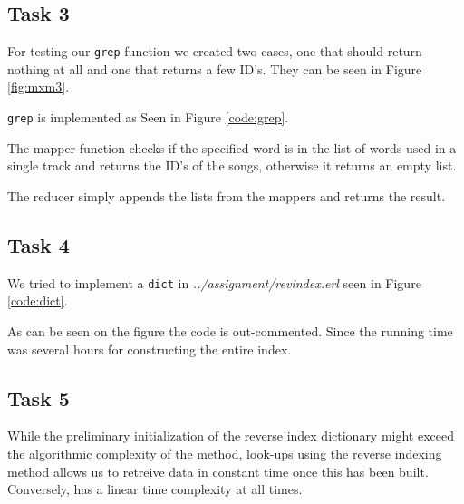 \subsection{Task 3}
For testing our \texttt{grep} function we created two cases, one that should
return nothing at all and one that returns a few ID's. They can be seen in
Figure \ref{fig:mxm3}.


\texttt{grep} is implemented as Seen in Figure \ref{code:grep}.




The mapper function checks if the specified word is in the list of words used in
a single track and returns the ID's of the songs, otherwise it returns an empty
list.

The reducer simply appends the lists from the mappers and returns the result.

\subsection{Task 4}
We tried to implement a \texttt{dict} in \textit{../assignment/revindex.erl} seen in Figure \ref{code:dict}.


As can be seen on the figure the code is out-commented. Since the running time was several hours for constructing the entire index.

\subsection{Task 5}
While the preliminary initialization of the reverse index dictionary might
exceed the algorithmic complexity of the  method, look-ups using
the reverse indexing method allows us to retreive data in constant time once
this has been built. Conversely,  has a linear time complexity at
all times.
